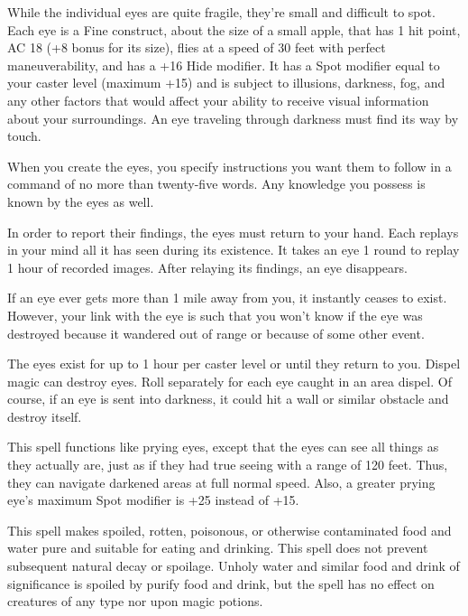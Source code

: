 \begin{multicols}{2}
\begin{small}
\smallskip\noindent While the individual eyes are quite fragile, they're small and difficult to spot. Each eye is a Fine construct, about the size of a small apple, that has 1 hit point, AC 18 (+8 bonus for its size), flies at a speed of 30 feet with perfect maneuverability, and has a +16 Hide modifier. It has a Spot modifier equal to your caster level (maximum +15) and is subject to illusions, darkness, fog, and any other factors that would affect your ability to receive visual information about your surroundings. An eye traveling through darkness must find its way by touch.

\smallskip\noindent When you create the eyes, you specify instructions you want them to follow in a command of no more than twenty-five words. Any knowledge you possess is known by the eyes as well.

\smallskip\noindent In order to report their findings, the eyes must return to your hand. Each replays in your mind all it has seen during its existence. It takes an eye 1 round to replay 1 hour of recorded images. After relaying its findings, an eye disappears. 

\smallskip\noindent If an eye ever gets more than 1 mile away from you, it instantly ceases to exist. However, your link with the eye is such that you won't know if the eye was destroyed because it wandered out of range or because of some other event.

\smallskip\noindent The eyes exist for up to 1 hour per caster level or until they return to you. Dispel magic can destroy eyes. Roll separately for each eye caught in an area dispel. Of course, if an eye is sent into darkness, it could hit a wall or similar obstacle and destroy itself.


\noindent This spell functions like prying eyes, except that the eyes can see all things as they actually are, just as if they had true seeing with a range of 120 feet. Thus, they can navigate darkened areas at full normal speed. Also, a greater prying eye's maximum Spot modifier is +25 instead of +15.

\noindent This spell makes spoiled, rotten, poisonous, or otherwise contaminated food and water pure and suitable for eating and drinking. This spell does not prevent subsequent natural decay or spoilage. Unholy water and similar food and drink of significance is spoiled by purify food and drink, but the spell has no effect on creatures of any type nor upon magic potions.


\end{small}
\end{multicols}
